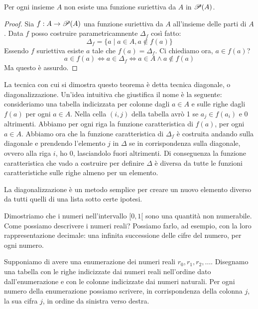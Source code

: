 \begin{thm}
    Per ogni insieme $A$ non esiste una funzione suriettiva da $A$ in $\mathscr{P}(A)$.
\end{thm}
\begin{proof}
    Sia $f : A \to \mathscr{P}(A)$ una funzione suriettiva da $A$ all'insieme delle parti di $A$. Data
    $f$ posso costruire parametricamnente $\Delta_{f}$ così fatto:
    \begin{equation*}
        \Delta_{f} = \{a \mid a \in A, a \notin f(a)\}
    \end{equation*}
    Essendo $f$ suriettiva esiste $a$ tale che $f(a) = \Delta_{f}$. Ci chiediamo ora, $a \in f(a)$?
    \begin{equation*}
        a \in f(a) \iff a \in \Delta_{f} \iff a \in A \land a \notin f(a)
    \end{equation*}
    Ma questo è assurdo.
\end{proof}

La tecnica con cui si dimostra questo teorema è detta tecnica diagonale, o diagonalizzazione.
Un'idea intuitiva che giustifica il nome è la seguente: consideriamo una tabella indicizzata per
colonne dagli $a \in A$ e sulle righe dagli $f(a)$ per ogni $a \in A$. Nella cella $(i,j)$ della
tabella avrò 1 se $a_{j} \in f(a_{i})$ e 0 altrimenti. Abbiamo per ogni riga la funzione
caratteristica di $f(a)$, per ogni $a \in A$. Abbiamo ora che la funzione caratteristica di
$\Delta_{f}$ è costruita andando sulla diagonale e prendendo l'elemento $j$ in $\Delta$ se in
corrispondenza sulla diagonale, ovvero alla riga $i$, ho 0, lasciandolo fuori altrimenti. Di
conseguenza la funzione caratteristica che vado a costruire per definire $\Delta$ è diversa da
tutte le funzioni caratteristiche sulle righe almeno per un elemento.

La diagonalizzazione è un metodo semplice per creare un nuovo elemento diverso da tutti quelli di
una lista sotto certe ipotesi.

Dimostriamo che i numeri nell'intervallo $[0,1[$ sono una quantità non numerabile. Come possiamo
descrivere i numeri reali? Possiamo farlo, ad esempio, con la loro rappresentazione decimale: una
infinita successione delle cifre del numero, per ogni numero.

Supponiamo di avere una enumerazione dei numeri reali $r_{0}, r_{1}, r_{2}, \dotsc$. Disegnamo una
tabella con le righe indicizzate dai numeri reali nell'ordine dato dall'enumerazione e con le
colonne indicizzate dai numeri naturali. Per ogni numero della enumerazione possiamo scrivere, in
corrispondenza della colonna $j$, la sua cifra $j$, in ordine da sinistra verso destra. 

